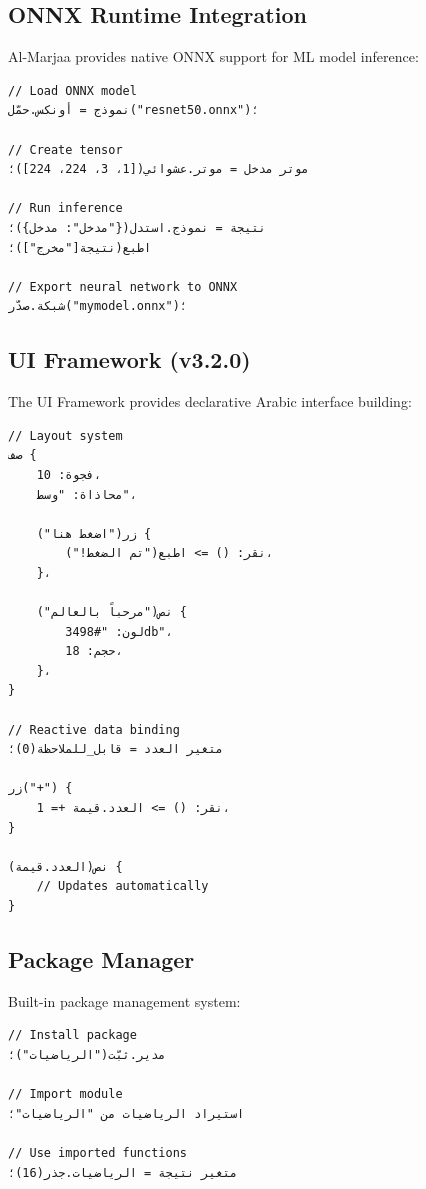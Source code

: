 \documentclass[11pt,a4paper]{article}
\begin{document}
\subsection{ONNX Runtime Integration}

Al-Marjaa provides native ONNX support for ML model inference:

\begin{lstlisting}[language={},title={ONNX Integration}]
// Load ONNX model
نموذج = أونكس.حمّل("resnet50.onnx")؛

// Create tensor
موتر مدخل = موتر.عشوائي([1، 3، 224، 224])؛

// Run inference
نتيجة = نموذج.استدل({"مدخل": مدخل})؛
اطبع(نتيجة["مخرج"])؛

// Export neural network to ONNX
شبكة.صدّر("mymodel.onnx")؛
\end{lstlisting}

\subsection{UI Framework (v3.2.0)}

The UI Framework provides declarative Arabic interface building:

\begin{lstlisting}[language={},title={UI Components}]
// Layout system
صف {
    فجوة: 10،
    محاذاة: "وسط"،
    
    زر("اضغط هنا") {
        نقر: () => اطبع("تم الضغط!")،
    }،
    
    نص("مرحباً بالعالم") {
        لون: "#3498db"،
        حجم: 18،
    }،
}

// Reactive data binding
متغير العدد = قابل_للملاحظة(0)؛

زر("+") {
    نقر: () => العدد.قيمة += 1،
}

نص(العدد.قيمة) {
    // Updates automatically
}
\end{lstlisting}

\subsection{Package Manager}

Built-in package management system:

\begin{lstlisting}[language={},title={Package Management}]
// Install package
مدير.ثبّت("الرياضيات")؛

// Import module
استيراد الرياضيات من "الرياضيات"؛

// Use imported functions
متغير نتيجة = الرياضيات.جذر(16)؛
\end{lstlisting}
\end{document}
